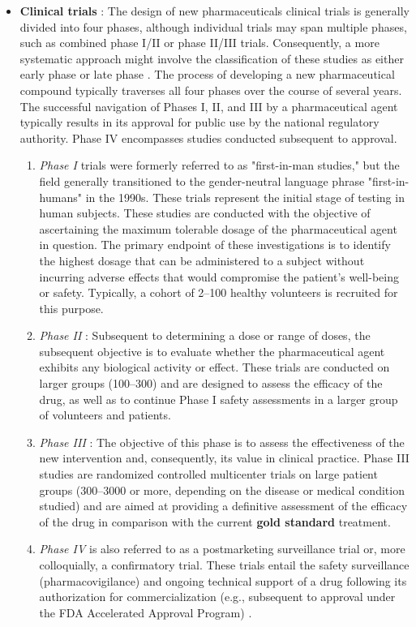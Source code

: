 \begin{itemize}
 	\item \textbf{Clinical trials} : The design of new pharmaceuticals clinical trials is generally divided into four phases, although individual trials may span multiple phases, such as combined phase I/II or phase II/III trials. Consequently, a more systematic approach might involve the classification of these studies as either early phase or late phase \cite{FDA2025}. The process of developing a new pharmaceutical compound typically traverses all four phases over the course of several years. The successful navigation of Phases I, II, and III by a pharmaceutical agent typically results in its approval for public use by the national regulatory authority. Phase IV encompasses studies conducted subsequent to approval.
 	\begin{enumerate}
 		\item \emph{Phase I} trials were formerly referred to as "first-in-man studies," but the field generally transitioned to the gender-neutral language phrase "first-in-humans" in the 1990s. These trials represent the initial stage of testing in human subjects. These studies are conducted with the objective of ascertaining the maximum tolerable dosage of the pharmaceutical agent in question. The primary endpoint of these investigations is to identify the highest dosage that can be administered to a subject without incurring adverse effects that would compromise the patient's well-being or safety. Typically, a cohort of 2–100 healthy volunteers is recruited for this purpose. 
 		
 		\item \emph{Phase II} : Subsequent to determining a dose or range of doses, the subsequent objective is to evaluate whether the pharmaceutical agent exhibits any biological activity or effect. These trials are conducted on larger groups (100–300) and are designed to assess the efficacy of the drug, as well as to continue Phase I safety assessments in a larger group of volunteers and patients.
 		
 		\item \emph{Phase III} : The objective of this phase is to assess the effectiveness of the new intervention and, consequently, its value in clinical practice. Phase III studies are randomized controlled multicenter trials on large patient groups (\num{300}–\num{3000} or more, depending on the disease or medical condition studied) and are aimed at providing a definitive assessment of the efficacy of the drug in comparison with the current \textbf{gold standard} treatment.
 		
 		\item \emph{Phase IV} is also referred to as a postmarketing surveillance trial or, more colloquially, a confirmatory trial. These trials entail the safety surveillance (pharmacovigilance) and ongoing technical support of a drug following its authorization for commercialization (e.g., subsequent to approval under the FDA Accelerated Approval Program) \cite{Lancet2009}.
 	\end{enumerate}
 \end{itemize}
 
